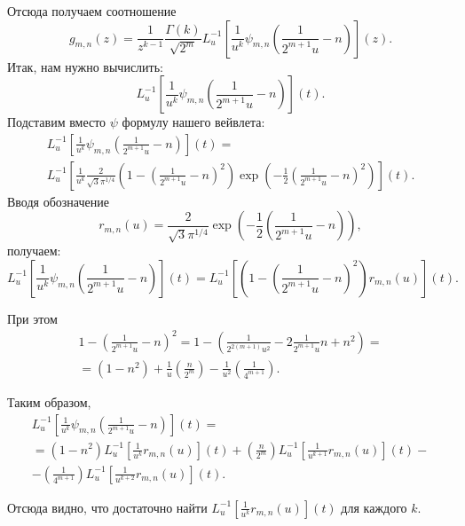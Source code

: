 \documentclass[../paper.tex]{subfiles}
\begin{document}
%
Отсюда получаем соотношение
\begin{equation}\label{eq:gmn-laplace}
    g_{m,n}(z)
    = \frac{1}{z^{k-1}} \frac{\Gamma(k)}{\sqrt{2^m}} L^{-1}_u \left[ \frac{1}{u^k} \psi_{m,n} \left( \frac{1}{2^{m+1} u} - n \right) \right] (z)
.\end{equation}
Итак, нам нужно вычислить:
\[
    L^{-1}_u \left[ \frac{1}{u^k} \psi_{m,n} \left( \frac{1}{2^{m+1} u} - n \right) \right] (t).
\]
Подставим вместо $\psi$ формулу нашего вейвлета:
\begin{multline*}
    L^{-1}_u \left[ \frac{1}{u^k} \psi_{m,n} \left( \frac{1}{2^{m+1} u} - n \right) \right] (t) =
\\%
    L^{-1}_u \left[ \frac{1}{u^k} \frac{2}{\sqrt{3} \pi^{1/4} } 
    \left( 1 - \left( \frac{1}{2^{m+1} u} - n \right)^2 \right) 
    \exp \left( -\frac{1}{2} \left( \frac{1}{2^{m+1}u} - n \right)^2  \right)
    \right](t).
\end{multline*}
Вводя обозначение
\[
    r_{m,n}(u) = \frac{2}{\sqrt{3} \pi^{1/4}} \exp \left( -\frac{1}{2} \left( \frac{1}{2^{m+1}u} - n \right)  \right) 
,\]
получаем:
\[
	L^{-1}_u \left[ \frac{1}{u^k} \psi_{m,n} \left( \frac{1}{2^{m+1} u} - n \right) \right] (t)
	= L^{-1}_u \left[ \left( 1 - \left( \frac{1}{2^{m+1} u} - n \right)^2 \right) r_{m,n}(u) \right](t).
\]

При этом
\begin{multline*}
    1 - \left( \frac{1}{2^{m+1} u } - n \right)^2 =
    1 - \left( \frac{1}{2^{2(m+1)} u^2} - 2 \frac{1}{2^{m+1} u } n + n^2 \right) =
\\=%
    \left( 1 - n^2 \right) + \frac{1}{u} \left(\frac{n}{2^m}\right) - \frac{1}{u^2} \left(\frac{1}{4^{m+1}}\right)
.\end{multline*}


Таким образом,
\begin{multline}\label{eq:invlap_gen}
    L^{-1}_u \left[ \frac{1}{u^k} \psi_{m,n} \left( \frac{1}{2^{m+1} u} - n \right) \right] (t)
=\\=
    \left( 1 - n^2 \right)  L^{-1}_u \left[ \frac{1}{u^k} r_{m,n}(u) \right](t) +
    \left( \frac{n}{2^m} \right)  L^{-1}_u \left[ \frac{1}{u^{k+1}} r_{m,n}(u) \right](t)
-\\-
    \left( \frac{1}{4^{m+1}} \right)  L^{-1}_u \left[ \frac{1}{u^{k+2}} r_{m,n}(u) \right](t)
.\end{multline}

Отсюда видно, что достаточно найти $L^{-1}_u [\frac{1}{u^k} r_{m,n}(u)](t)$ для каждого $k$.
\end{document}
